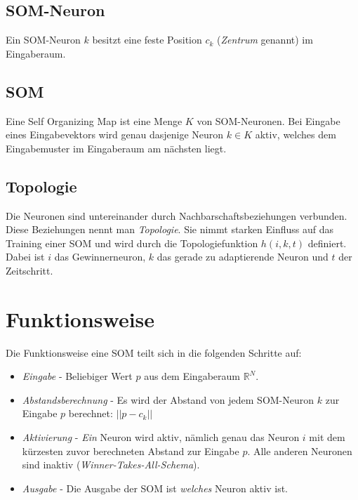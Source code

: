 \subsection*{SOM-Neuron}
Ein SOM-Neuron $k$ besitzt eine feste Position $c_k$ (\emph{Zentrum} genannt) im Eingaberaum.


\subsection*{SOM}
Eine Self Organizing Map ist eine Menge $K$ von SOM-Neuronen. Bei Eingabe eines Eingabevektors wird genau dasjenige Neuron $k \in K$ aktiv, welches dem Eingabemuster im Eingaberaum am nächsten liegt.


\subsection*{Topologie}
Die Neuronen sind untereinander durch Nachbarschaftsbeziehungen verbunden. Diese Beziehungen nennt man \emph{Topologie}. Sie nimmt starken Einfluss auf das Training einer SOM und wird durch die Topologiefunktion $h(i,k,t)$ definiert.
Dabei ist $i$ das Gewinnerneuron, $k$ das gerade zu adaptierende Neuron und $t$ der Zeitschritt.


\section*{Funktionsweise}
Die Funktionsweise eine SOM teilt sich in die folgenden Schritte auf:

\begin{itemize}
	\item \emph{Eingabe} - Beliebiger Wert $p$ aus dem Eingaberaum $\mathbb{R}^N$.
	\item \emph{Abstandsberechnung} - Es wird der Abstand von jedem SOM-Neuron $k$ zur Eingabe $p$ berechnet: $||p - c_k||$
	\item \emph{Aktivierung} - \emph{Ein} Neuron wird aktiv, nämlich genau das Neuron $i$ mit dem kürzesten zuvor berechneten Abstand zur Eingabe $p$. Alle anderen Neuronen sind inaktiv (\emph{Winner-Takes-All-Schema}).
	\item \emph{Ausgabe} - Die Ausgabe der SOM ist \emph{welches} Neuron aktiv ist. 
\end{itemize}


